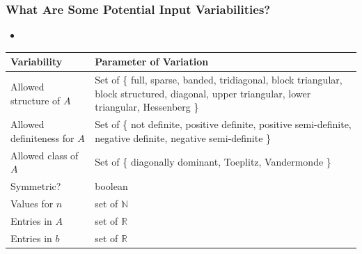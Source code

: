 \documentclass[t,12pt,numbers,fleqn]{beamer}
\newcommand{\colA}{2.1cm}
\newcommand{\colB}{6.9cm}
\newcommand{\colC}{1.1cm} %
\begin{document}

\begin{frame}
\frametitle{What Are Some Potential Input Variabilities?}

\begin{itemize}
	
\item {}
    
\end{itemize}

\end{frame}




\begin{frame}

\begin{table}
\begin{tabular}{| p{\colA} | p{\colB} | }
\hline
\textbf{Variability} & \textbf{Parameter of Variation} \\
\hline
Allowed structure of $A$ & Set of \{ full, sparse, banded, tridiagonal, block triangular,
block structured, diagonal, upper triangular, lower triangular, Hessenberg \} \\
\hline
Allowed definiteness for $A$ & Set of \{ not definite, positive definite, positive semi-definite,
negative definite, negative semi-definite \} \\
\hline
Allowed class of $A$ & Set of \{ diagonally dominant, Toeplitz, Vandermonde \} \\
\hline
Symmetric? & boolean \\
\hline
Values for $n$ & set of $\mathbb{N}$ \\
\hline
Entries in $A$ & set of $\mathbb{R}$ \\
\hline
Entries in $b$ & set of $\mathbb{R}$ \\
\hline
\end{tabular}
\end{table}

\end{frame}
\end{document}
